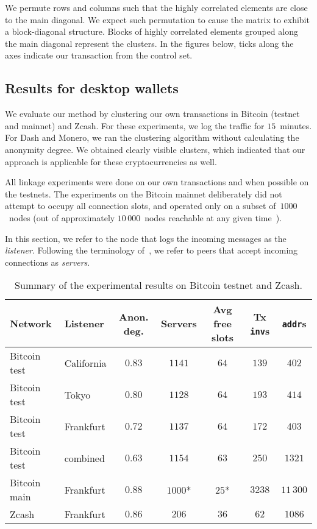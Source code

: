 We permute rows and columns such that the highly correlated elements are close to the main diagonal.
We expect such permutation to cause the matrix to exhibit a block-diagonal structure.
Blocks of highly correlated elements grouped along the main diagonal represent the clusters.
In the figures below, ticks along the axes indicate our transaction from the control set.


\subsection{Results for desktop wallets}

We evaluate our method by clustering our own transactions in Bitcoin (testnet and mainnet) and Zcash.
For these experiments, we log the traffic for $15$~minutes.
For Dash and Monero, we ran the clustering algorithm without calculating the anonymity degree.
We obtained clearly visible clusters, which indicated that our approach is applicable for these cryptocurrencies as well.

All linkage experiments were done on our own transactions and when possible on the testnets.
The experiments on the Bitcoin mainnet deliberately did not attempt to occupy all connection slots, and operated only on a subset of~$1000$~nodes (out of approximately $10\,000$~nodes reachable at any given time~\cite{Bitnodes}).

In this section, we refer to the node that logs the incoming messages as the \textit{listener}.
Following the terminology of~\cite{Biryukov2014}, we refer to peers that accept incoming connections as \textit{servers}.

\begin{table*}[!t]
	\normalsize
	\caption{Summary of the experimental results on Bitcoin testnet and Zcash.}
	\centering
	\begin{tabular}{|l|l|c|c|c|c|c|}
		\hline
		Network & Listener & Anon\@. deg. & Servers & Avg free slots & Tx \texttt{inv}s & \texttt{addr}s \\
		\hline
		Bitcoin test & California & $0.83$ & $1141$ & $64$ & $139$ & $402$ \\
		Bitcoin test & Tokyo & $0.80$ & $1128$ & $64$ & $193$ & $414$ \\
		Bitcoin test & Frankfurt & $0.72$ & $1137$ & $64$ & $172$ & $403$ \\
		Bitcoin test & combined & $0.63$ & $1154$ & $63$ & $250$ & $1321$ \\
		Bitcoin main & Frankfurt & $0.88$ & $1000$* & $25$* & $3238$ & $11\,300$ \\
		Zcash & Frankfurt & $0.86$ & $206$ & $36$ & $62$ & $1086$ \\
		\hline
	\end{tabular}
	\label{tab:results}
\end{table*}

